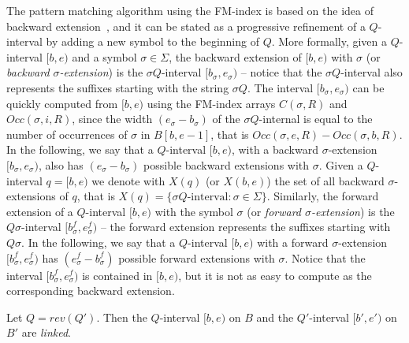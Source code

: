 \documentclass[runningheads,envcountsame,a4paper]{llncs}
\begin{document}
The pattern matching algorithm using the FM-index is based on the idea of backward extension~\cite{Ferragina2000},
and it can be stated as a progressive refinement of a $Q$-interval by adding a new symbol to the beginning of $Q$.
More formally, given a $Q$-interval $[b,e)$ and a symbol $\sigma \in \Sigma$, the backward
extension of $[b,e)$ with $\sigma$ (or \emph{backward
$\sigma$-extension}) is the $\sigma Q$-interval $[b_{\sigma},e_{\sigma})$
-- notice that the $\sigma Q$-interval also represents the  suffixes starting with
the string $\sigma Q$. The interval $[b_{\sigma},e_{\sigma})$ can be quickly computed
from $[b,e)$ using the FM-index arrays $C(\sigma,R)$ and
$Occ(\sigma, i, R)$, since the width $(e_{\sigma}-b_{\sigma})$ of the $\sigma Q$-internal is equal
to the number of occurrences of  $\sigma$ in $B[b,e-1]$, that is $Occ(\sigma, e, R)-Occ(\sigma, b, R)$.
In the following,
we say that a  $Q$-interval $[b,e)$, with a backward $\sigma$-extension $[b_{\sigma},e_{\sigma})$, also has $(e_{\sigma}-b_{\sigma})$ possible backward
extensions with $\sigma$.
Given a $Q$-interval $q=[b,e)$ we denote with $X(q)$ (or $X(b,e)$)
the set of all  backward $\sigma$-extensions of $q$, that is $X(q)=\{ \sigma Q\text{-interval}: \sigma\in\Sigma\}$.
Similarly, the forward extension of a $Q$-interval $[b,e)$ with the symbol
$\sigma$ (or  \emph{forward $\sigma$-extension}) is the
$Q \sigma$-interval $[b^f_{\sigma},e^f_{\sigma})$ -- the forward extension represents the suffixes
starting with $Q \sigma$. In the following, we say that a
$Q$-interval $[b,e)$ with  a forward $\sigma$-extension
$[b^f_{\sigma},e^f_{\sigma})$ has $(e^f_{\sigma}-b^f_{\sigma})$
possible forward extensions with $\sigma$. Notice that the interval
$[b^f_{\sigma},e^f_{\sigma})$ is contained in $[b,e)$, but it is not as easy to compute as the corresponding backward extension.


\begin{definition}
\label{def:linked-intervals}
Let  $Q=rev(Q')$.
Then the $Q$-interval $[b,e)$ on $B$ and the $Q'$-interval $[b',e')$ on $B'$ are
\emph{linked}.
\end{definition}
\end{document}
